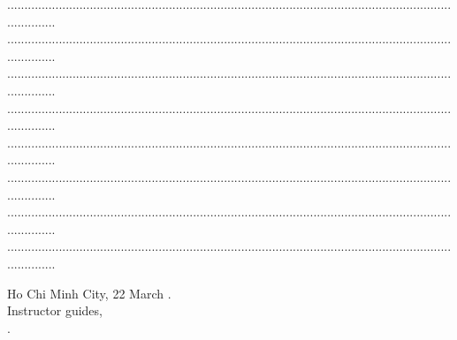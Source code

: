 	...............................................................................................................................................\\
	...............................................................................................................................................\\
	...............................................................................................................................................\\
	...............................................................................................................................................\\
	...............................................................................................................................................\\
	...............................................................................................................................................\\
	...............................................................................................................................................\\
	...............................................................................................................................................
\begin{center}
	\hspace*{5cm} Ho Chi Minh City, 22 March \nam.\\
	\hspace*{5cm} Instructor guides,\\
	\vspace*{2cm}
	\hspace*{5cm} \gvhd.
\newpage
\end{center}
